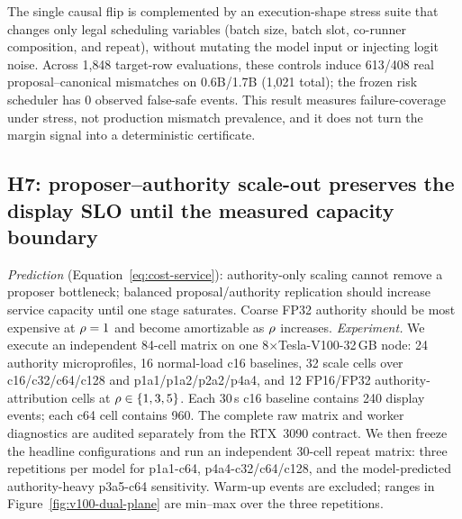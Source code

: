 The single causal flip is complemented by an execution-shape stress suite
that changes only legal scheduling variables (batch size, batch slot,
co-runner composition, and repeat), without mutating the model input or
injecting logit noise. Across 1{,}848 target-row evaluations, these controls
induce 613/408 real proposal--canonical mismatches on 0.6B/1.7B
(1{,}021 total); the frozen risk scheduler has 0 observed false-safe events.
This result measures failure-coverage under stress, not production mismatch
prevalence, and it does not turn the margin signal into a deterministic
certificate.

\subsection{H7: proposer--authority scale-out preserves the display SLO until
the measured capacity boundary}\label{sec:eval:h7}

\emph{Prediction} (Equation~\eqref{eq:cost-service}): authority-only scaling
cannot remove a proposer bottleneck; balanced proposal/authority replication
should increase service capacity until one stage saturates. Coarse FP32
authority should be most expensive at $\rho=1$ and become amortizable as
$\rho$ increases.
\emph{Experiment.} We execute an independent 84-cell matrix on one
8$\times$Tesla-V100-32\,GB node: 24 authority microprofiles, 16 normal-load
c16 baselines, 32 scale cells over c16/c32/c64/c128 and p1a1/p1a2/p2a2/p4a4,
and 12 FP16/FP32 authority-attribution cells at
$\rho\in\{1,3,5\}$. Each 30\,s c16 baseline contains 240 display events;
each c64 cell contains 960. The complete raw matrix and worker diagnostics are
audited separately from the RTX~3090 contract. We then freeze the headline
configurations and run an independent 30-cell repeat matrix: three repetitions
per model for p1a1-c64, p4a4-c32/c64/c128, and the model-predicted
authority-heavy p3a5-c64 sensitivity. Warm-up events are excluded; ranges in
Figure~\ref{fig:v100-dual-plane} are min--max over the three repetitions.


